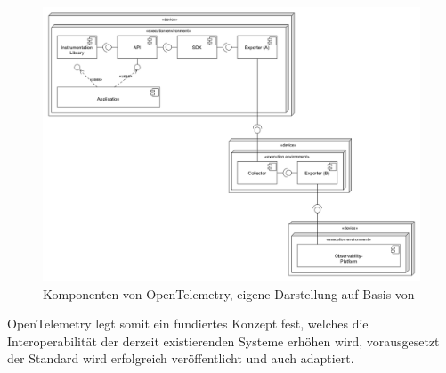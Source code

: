 \begin{figure}[H]
	\centering
	\includegraphics[width=1.00\linewidth]{img/03_methoden/otel_components.png}
	\caption{Komponenten von OpenTelemetry, eigene Darstellung auf Basis von \cite{OTelSpecification}}
	\label{fig:otel-components}
\end{figure}

OpenTelemetry legt somit ein fundiertes Konzept fest, welches die Interoperabilität der derzeit existierenden Systeme erhöhen wird, vorausgesetzt der Standard wird erfolgreich veröffentlicht und auch adaptiert.